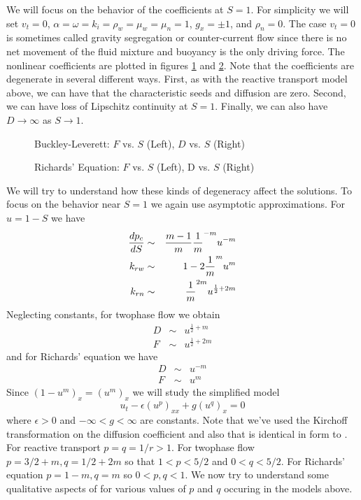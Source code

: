 \documentclass[10pt,dvips,twoside,reqno]{amsart}
\begin{document}
 We will focus on the behavior of
the coefficients at $S=1$. For simplicity we will set $v_t=0$, $\alpha
= \omega = k_i = \rho_w = \mu_w = \mu_n = 1$, $g_x = \pm 1$, and
$\rho_n = 0$.  The case $v_t=0$ is sometimes called gravity
segregation or counter-current flow since there is no net movement of
the fluid mixture and buoyancy is the only driving force.  The
nonlinear coefficients are plotted in figures \ref{blCoeff} and
\ref{reCoeff}. Note that the coefficients are degenerate in several
different ways. First, as with the reactive transport model above, we
can have that the characteristic seeds and diffusion are zero. Second,
we can have loss of Lipschitz continuity at $S=1$.  Finally, we can
also have $D \rightarrow \infty$ as $S \rightarrow 1$.
\begin{figure}
\caption{Buckley-Leverett: $F$ vs. $S$ (Left), $D$ vs. $S$ (Right) \label{blCoeff}}
\end{figure}
\begin{figure}
\caption{Richards' Equation: $F$ vs. $S$ (Left), D vs. $S$ (Right) \label{reCoeff}}
\end{figure}
We will try to understand how these kinds of degeneracy affect the solutions. To focus on the behavior near $S=1$ we again use asymptotic approximations. For $u=1-S$ we have 
\begin{eqnarray}
\frac{d {p_c}}{d {S}} &\sim& \frac{m-1}{m}\frac{1}{m}^{-m} u^{-m} \\
k_{rw} &\sim& 1-2 \frac{1}{m}^m u^m \\
k_{rn} &\sim& \frac{1}{m}^{2m} u^{\frac{1}{2}+2m}
\end{eqnarray}
Neglecting constants, for twophase flow we obtain
\begin{eqnarray}
  \label{eq:twopSimpCoef}
  D &\sim &  u^{\frac{1}{2}+m} \\
  F &\sim &  u^{\frac{1}{2}+2m} 
\end{eqnarray}
and for Richards' equation we have
\begin{eqnarray}
  D &\sim &  u^{-m} \\
  F &\sim &  u^m 
\end{eqnarray}
Since $(1-u^m)_x = (u^m)_x$ we will study the simplified model
\begin{equation}
  \label{eq:simpMod}
  u_t - \epsilon (u^p)_{xx} + g (u^q)_{x} = 0
\end{equation}
where $\epsilon > 0$ and $-\infty < g <\infty$ are constants. Note
that we've used the Kirchoff transformation on the diffusion
coefficient and also that  is identical in form to
. For reactive transport $p=q=1/r > 1$. For twophase
flow $p = 3/2 + m,q=1/2+2m$ so that $1<p<5/2$ and $0<q<5/2$. For
Richards' equation $p=1-m, q = m$ so $0<p,q<1$. We now try to
understand some qualitative aspects of  for various
values of $p$ and $q$ occuring in the models above.
\end{document}
